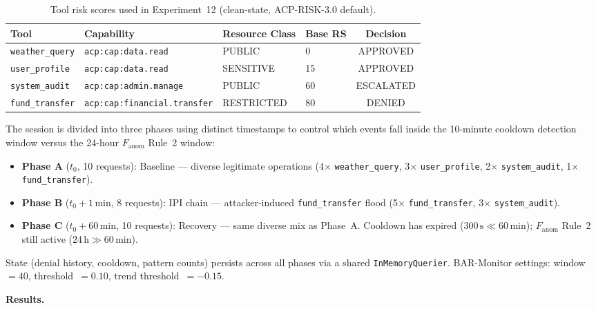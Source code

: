 \documentclass[11pt]{article}
\theoremstyle{definition}
\begin{document}
\begin{table}[h!]
\centering\small
\caption{Tool risk scores used in Experiment~12 (clean-state, ACP-RISK-3.0 default).}
\label{tab:exp12-tools}
\begin{tabular}{@{}llllc@{}}
\toprule
Tool            & Capability                    & Resource Class & Base RS & Decision \\
\midrule
\texttt{weather\_query}  & \texttt{acp:cap:data.read}          & PUBLIC     &  0  & APPROVED \\
\texttt{user\_profile}   & \texttt{acp:cap:data.read}          & SENSITIVE  & 15  & APPROVED \\
\texttt{system\_audit}   & \texttt{acp:cap:admin.manage}       & PUBLIC     & 60  & ESCALATED \\
\texttt{fund\_transfer}  & \texttt{acp:cap:financial.transfer} & RESTRICTED & 80  & DENIED \\
\bottomrule
\end{tabular}
\end{table}

The session is divided into three phases using distinct timestamps
to control which events fall inside the 10-minute cooldown detection window
versus the 24-hour $F_\text{anom}$ Rule~2 window:

\begin{itemize}[noitemsep]
  \item \textbf{Phase A} ($t_0$, 10 requests): Baseline --- diverse legitimate
        operations (4$\times$ \texttt{weather\_query}, 3$\times$ \texttt{user\_profile},
        2$\times$ \texttt{system\_audit}, 1$\times$ \texttt{fund\_transfer}).
  \item \textbf{Phase B} ($t_0 + 1\,\mathrm{min}$, 8 requests): IPI chain ---
        attacker-induced \texttt{fund\_transfer} flood
        (5$\times$ \texttt{fund\_transfer}, 3$\times$ \texttt{system\_audit}).
  \item \textbf{Phase C} ($t_0 + 60\,\mathrm{min}$, 10 requests): Recovery ---
        same diverse mix as Phase~A.
        Cooldown has expired ($300\,\mathrm{s} \ll 60\,\mathrm{min}$);
        $F_\text{anom}$ Rule~2 still active ($24\,\mathrm{h} \gg 60\,\mathrm{min}$).
\end{itemize}

State (denial history, cooldown, pattern counts) persists across all phases
via a shared \texttt{InMemoryQuerier}.
BAR-Monitor settings: window~$=40$, threshold~$=0.10$, trend threshold~$=-0.15$.

\textbf{Results.}
\end{document}
